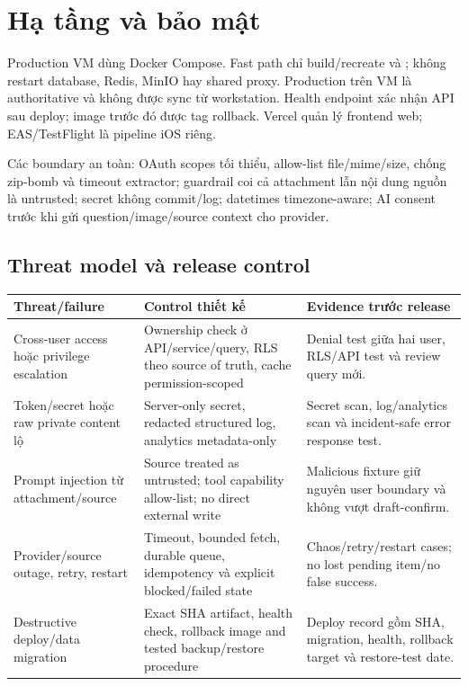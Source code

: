 \documentclass[11pt,a4paper]{article}
\begin{document}
\section{Hạ tầng và bảo mật}
Production VM dùng Docker Compose. Fast path chỉ build/recreate  và ; không restart database, Redis, MinIO hay shared proxy. Production  trên VM là authoritative và không được sync từ workstation. Health endpoint xác nhận API sau deploy; image trước đó được tag rollback. Vercel quản lý frontend web; EAS/TestFlight là pipeline iOS riêng.

Các boundary an toàn: OAuth scopes tối thiểu, allow-list file/mime/size, chống zip-bomb và timeout extractor; guardrail coi cả attachment lẫn nội dung nguồn là untrusted; secret không commit/log; datetimes timezone-aware; AI consent trước khi gửi question/image/source context cho provider.

\subsection{Threat model và release control}
\begin{longtable}{p{3.4cm}p{4.3cm}p{5.6cm}}
\toprule Threat/failure & Control thiết kế & Evidence trước release \\ \midrule\endhead
Cross-user access hoặc privilege escalation & Ownership check ở API/service/query, RLS theo source of truth, cache permission-scoped & Denial test giữa hai user, RLS/API test và review query mới. \\
Token/secret hoặc raw private content lộ & Server-only secret, redacted structured log, analytics metadata-only & Secret scan, log/analytics scan và incident-safe error response test. \\
Prompt injection từ attachment/source & Source treated as untrusted; tool capability allow-list; no direct external write & Malicious fixture giữ nguyên user boundary và không vượt draft-confirm. \\
Provider/source outage, retry, restart & Timeout, bounded fetch, durable queue, idempotency và explicit blocked/failed state & Chaos/retry/restart cases; no lost pending item/no false success. \\
Destructive deploy/data migration & Exact SHA artifact, health check, rollback image and tested backup/restore procedure & Deploy record gồm SHA, migration, health, rollback target và restore-test date. \\
\bottomrule
\end{longtable}
\end{document}
